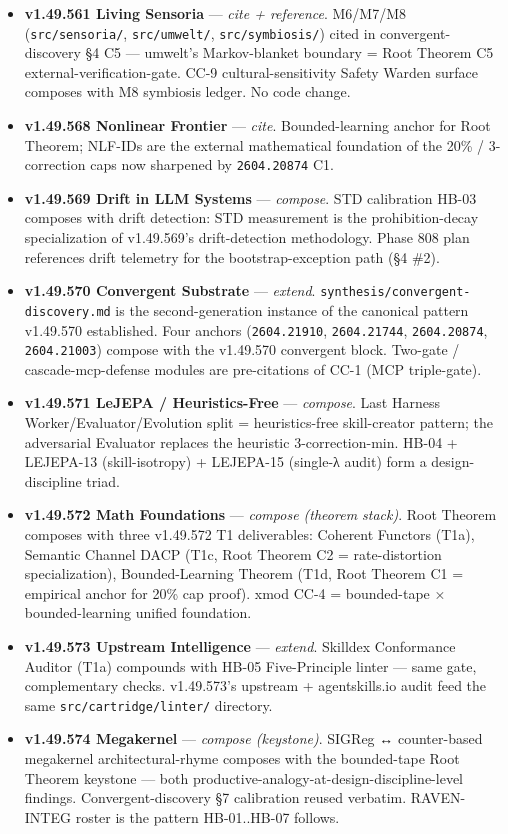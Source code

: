 \documentclass[11pt,letterpaper]{article}
\newcommand{\arxivid}[1]{\texttt{\textcolor{accent}{#1}}}
\providecommand{\tightlist}{\setlength{\itemsep}{0pt}\setlength{\parskip}{0pt}}
\begin{document}
\begin{itemize}
\tightlist
\item
  \textbf{v1.49.561 Living Sensoria} --- \emph{cite + reference}.
  M6/M7/M8 (\texttt{src/sensoria/}, \texttt{src/umwelt/},
  \texttt{src/symbiosis/}) cited in convergent-discovery §4 C5 ---
  umwelt's Markov-blanket boundary = Root Theorem C5
  external-verification-gate. CC-9 cultural-sensitivity Safety Warden
  surface composes with M8 symbiosis ledger. No code change.
\item
  \textbf{v1.49.568 Nonlinear Frontier} --- \emph{cite}.
  Bounded-learning anchor for Root Theorem; NLF-IDs are the external
  mathematical foundation of the 20\% / 3-correction caps now sharpened
  by \arxivid{2604.20874} C1.
\item
  \textbf{v1.49.569 Drift in LLM Systems} --- \emph{compose}. STD
  calibration HB-03 composes with drift detection: STD measurement is
  the prohibition-decay specialization of v1.49.569's drift-detection
  methodology. Phase 808 plan references drift telemetry for the
  bootstrap-exception path (§4 \#2).
\item
  \textbf{v1.49.570 Convergent Substrate} --- \emph{extend}.
  \texttt{synthesis/convergent-discovery.md} is the second-generation
  instance of the canonical pattern v1.49.570 established. Four anchors
  (\arxivid{2604.21910}, \arxivid{2604.21744}, \arxivid{2604.20874},
  \arxivid{2604.21003}) compose with the v1.49.570 convergent block.
  Two-gate / cascade-mcp-defense modules are pre-citations of CC-1 (MCP
  triple-gate).
\item
  \textbf{v1.49.571 LeJEPA / Heuristics-Free} --- \emph{compose}. Last
  Harness Worker/Evaluator/Evolution split = heuristics-free
  skill-creator pattern; the adversarial Evaluator replaces the
  heuristic 3-correction-min. HB-04 + LEJEPA-13 (skill-isotropy) +
  LEJEPA-15 (single-λ audit) form a design-discipline triad.
\item
  \textbf{v1.49.572 Math Foundations} --- \emph{compose (theorem
  stack)}. Root Theorem composes with three v1.49.572 T1 deliverables:
  Coherent Functors (T1a), Semantic Channel DACP (T1c, Root Theorem C2 =
  rate-distortion specialization), Bounded-Learning Theorem (T1d, Root
  Theorem C1 = empirical anchor for 20\% cap proof). xmod CC-4 =
  bounded-tape × bounded-learning unified foundation.
\item
  \textbf{v1.49.573 Upstream Intelligence} --- \emph{extend}. Skilldex
  Conformance Auditor (T1a) compounds with HB-05 Five-Principle linter
  --- same gate, complementary checks. v1.49.573's upstream +
  agentskills.io audit feed the same \texttt{src/cartridge/linter/}
  directory.
\item
  \textbf{v1.49.574 Megakernel} --- \emph{compose (keystone)}. SIGReg ↔
  counter-based megakernel architectural-rhyme composes with the
  bounded-tape Root Theorem keystone --- both
  productive-analogy-at-design-discipline-level findings.
  Convergent-discovery §7 calibration reused verbatim. RAVEN-INTEG
  roster is the pattern HB-01..HB-07 follows.
\end{itemize}
\end{document}
